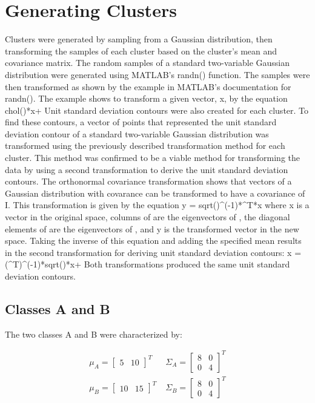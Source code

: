 \section{Generating Clusters}
 Clusters were generated by sampling from a Gaussian distribution, then transforming the samples of each cluster based on the cluster's mean and covariance matrix. The random samples of a standard two-variable Gaussian distribution were generated using MATLAB's randn() function. The samples were then transformed as shown by the example in MATLAB's documentation for randn(). The example shows to transform a given vector, x, by the equation
chol(\Sigma)*x+\mu
Unit standard deviation contours were also created for each cluster. To find these contours, a vector of points that represented the unit standard deviation contour of a standard two-variable Gaussian distribution was transformed using the previously described transformation method for each cluster.
This method was confirmed to be a viable method for transforming the data by using a second transformation to derive the unit standard deviation contours. The orthonormal covariance transformation shows that vectors of a Gaussian distribution with covarance \Sigma can be transformed to have a covariance of I. This transformation is given by the equation
y = sqrt(\hat)^(-1)*\Phi^T*x
where x is a vector in the original space, columns of \Phi are the eigenvectors of \Sigma, the diagonal elements of \hat are the eigenvectors of \Sigma, and y is the transformed vector in the new space. Taking the inverse of this equation and adding the specified mean results in the second transformation for deriving unit standard deviation contours:
x = (\Phi^T)^(-1)*sqrt(\hat)*x+\mu
Both transformations produced the same unit standard deviation contours.
 
 \subsection{Classes A and B}
 The two classes A and B were characterized by:

\begin{eqnarray}
{\mu}_{A}=\left[ \begin{smallmatrix} 5&10 \end{smallmatrix}\right]^{T} \; & {\Sigma}_{A}=\left[ \begin{smallmatrix} 8&0 \\ 0&4 \end{smallmatrix}\right]^{T} \nonumber\\
{\mu}_{B}=\left[ \begin{smallmatrix} 10&15 \end{smallmatrix}\right]^{T} \; & {\Sigma}_{B}=\left[ \begin{smallmatrix} 8&0 \\ 0&4 \end{smallmatrix}\right]^{T} \nonumber
\end{eqnarray}

